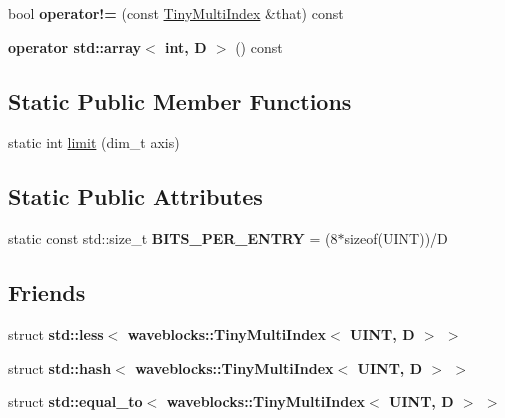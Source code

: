 \begin{DoxyCompactItemize}
\item 
\hypertarget{classwaveblocks_1_1_tiny_multi_index_a6d270db2c99ce81e9536256f2f75b54c}{}bool {\bfseries operator!=} (const \hyperlink{classwaveblocks_1_1_tiny_multi_index}{Tiny\+Multi\+Index} \&that) const \label{classwaveblocks_1_1_tiny_multi_index_a6d270db2c99ce81e9536256f2f75b54c}

\item 
\hypertarget{classwaveblocks_1_1_tiny_multi_index_af5fee86089d95574b827a832afac28b2}{}{\bfseries operator std\+::array$<$ int, D $>$} () const \label{classwaveblocks_1_1_tiny_multi_index_af5fee86089d95574b827a832afac28b2}

\end{DoxyCompactItemize}
\subsection*{Static Public Member Functions}
\begin{DoxyCompactItemize}
\item 
static int \hyperlink{classwaveblocks_1_1_tiny_multi_index_a3ef95351c0bff0196d5dd3c06d5e1ff4}{limit} (dim\+\_\+t axis)
\end{DoxyCompactItemize}
\subsection*{Static Public Attributes}
\begin{DoxyCompactItemize}
\item 
\hypertarget{classwaveblocks_1_1_tiny_multi_index_ab9aad21928e5f93d7665f2047352e326}{}static const std\+::size\+\_\+t {\bfseries B\+I\+T\+S\+\_\+\+P\+E\+R\+\_\+\+E\+N\+T\+R\+Y} = (8$\ast$sizeof(U\+I\+N\+T))/D\label{classwaveblocks_1_1_tiny_multi_index_ab9aad21928e5f93d7665f2047352e326}

\end{DoxyCompactItemize}
\subsection*{Friends}
\begin{DoxyCompactItemize}
\item 
\hypertarget{classwaveblocks_1_1_tiny_multi_index_a82461f7c108b310fb85d1c7b4c6a995a}{}struct {\bfseries std\+::less$<$ waveblocks\+::\+Tiny\+Multi\+Index$<$ U\+I\+N\+T, D $>$ $>$}\label{classwaveblocks_1_1_tiny_multi_index_a82461f7c108b310fb85d1c7b4c6a995a}

\item 
\hypertarget{classwaveblocks_1_1_tiny_multi_index_aa5f9866b959ef70497c168e4d9b3ed98}{}struct {\bfseries std\+::hash$<$ waveblocks\+::\+Tiny\+Multi\+Index$<$ U\+I\+N\+T, D $>$ $>$}\label{classwaveblocks_1_1_tiny_multi_index_aa5f9866b959ef70497c168e4d9b3ed98}

\item 
\hypertarget{classwaveblocks_1_1_tiny_multi_index_ae7574f0ab0b497996b514141fb6bab93}{}struct {\bfseries std\+::equal\+\_\+to$<$ waveblocks\+::\+Tiny\+Multi\+Index$<$ U\+I\+N\+T, D $>$ $>$}\label{classwaveblocks_1_1_tiny_multi_index_ae7574f0ab0b497996b514141fb6bab93}

\end{DoxyCompactItemize}


